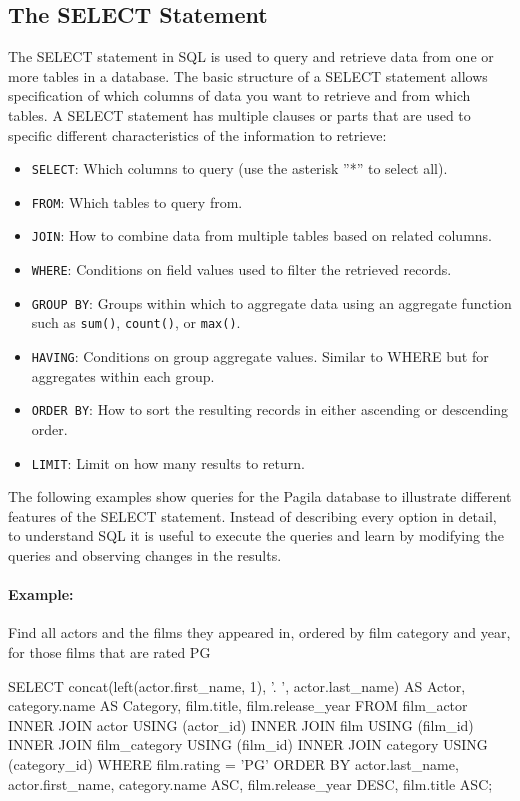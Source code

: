 \subsection*{The SELECT Statement}

The SELECT statement in SQL is used to query and retrieve data from one or more tables in a database. The basic structure of a SELECT statement allows specification of which columns of data you want to retrieve and from which tables. A SELECT statement has multiple clauses or parts that are used to specific different characteristics of the information to retrieve:

\begin{itemize}
 \item \texttt{SELECT}: Which columns to query (use the asterisk ''*'' to select all).
 \item \texttt{FROM}: Which tables to query from.
 \item \texttt{JOIN}: How to combine data from multiple tables based on related columns.
 \item \texttt{WHERE}: Conditions on field values used to filter the retrieved records.
 \item \texttt{GROUP BY}: Groups within which to aggregate data using an aggregate function such as \texttt{sum()}, \texttt{count()}, or \texttt{max()}.
 \item \texttt{HAVING}: Conditions on group aggregate values. Similar to WHERE but for aggregates within each group.
 \item \texttt{ORDER BY}: How to sort the resulting records in either ascending or descending order.
 \item \texttt{LIMIT}: Limit on how many results to return.
\end{itemize}

The following examples show queries for the Pagila database to illustrate different features of the SELECT statement. Instead of describing every option in detail, to understand SQL it is useful to execute the queries and learn by modifying the queries and observing changes in the results. 

\paragraph{Example:} Find all actors and the films they appeared in, ordered by film category and year, for those films that are rated PG

\begin{samepage}
\begin{sqlcode}
SELECT concat(left(actor.first_name, 1), '. ', 
           actor.last_name) AS Actor, 
       category.name AS Category, 
       film.title, 
       film.release_year
  FROM film_actor
  INNER JOIN actor USING (actor_id)
  INNER JOIN film USING (film_id)
  INNER JOIN film_category USING (film_id)
  INNER JOIN category USING (category_id)
  WHERE film.rating = 'PG'
  ORDER BY actor.last_name, 
           actor.first_name, 
           category.name ASC, 
           film.release_year DESC, 
           film.title ASC;
\end{sqlcode}
\end{samepage}

